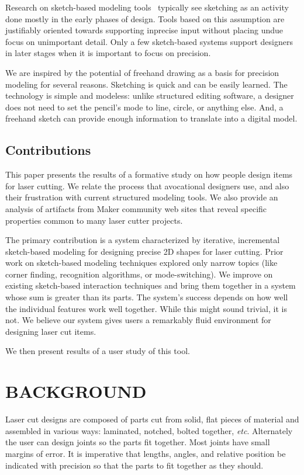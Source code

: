 \documentclass{article}
\begin{document}
Research on sketch-based modeling tools~\cite{johnson-sketch-review}
typically see sketching as an activity done mostly in the early phases
of design. Tools based on this assumption are justifiably oriented
towards supporting inprecise input without placing undue focus on
unimportant detail. Only a few sketch-based systems support designers
in later stages when it is important to focus on precision. 

We are inspired by the potential of freehand drawing as a basis for
precision modeling for several reasons. Sketching is quick and can be
easily learned. The technology is simple and modeless: unlike
structured editing software, a designer does not need to set the
pencil's mode to line, circle, or anything else. And, a freehand
sketch can provide enough information to translate into a digital
model.

\subsection{Contributions}

This paper presents the results of a formative study on how people
design items for laser cutting. We relate the process that avocational
designers use, and also their frustration with current structured
modeling tools. We also provide an analysis of artifacts from Maker
community web sites that reveal specific properties common to many
laser cutter projects.

The primary contribution is a system characterized by iterative,
incremental sketch-based modeling for designing precise 2D shapes for
laser cutting. Prior work on sketch-based modeling techniques explored
only narrow topics (like corner finding, recognition algorithms, or
mode-switching). We improve on existing sketch-based interaction
techniques and bring them together in a system whose sum is greater
than its parts. The system's success depends on how well the
individual features work well together. While this might sound
trivial, it is not. We believe our system gives users a remarkably
fluid environment for designing laser cut items.

We then present results of a user study of this tool. %

\section{BACKGROUND}

Laser cut designs are composed of parts cut from solid, flat pieces of
material and assembled in various ways: laminated, notched, bolted
together, \textit{etc}. Alternately the user can design joints so the
parts fit together. Most joints have small margins of error. It is
imperative that lengths, angles, and relative position be indicated
with precision so that the parts to fit together as they should.
\end{document}
